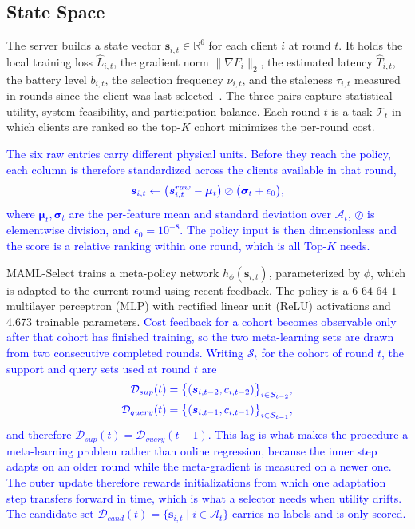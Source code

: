 \documentclass[journal]{IEEEtran}
\theoremstyle{remark}
\newcommand{\revision}[1]{#1}
\newcommand{\revtwo}[1]{\textcolor{blue}{#1}}
\newcommand{\revtwoeq}{\color{blue}}
\begin{document}
\subsection{State Space}
\revision{The server builds a state vector $\bm{s}_{i,t} \in \mathbb{R}^6$ for each client $i$ at round $t$. It holds the local training loss $\hat{L}_{i,t}$, the gradient norm $\|\nabla F_i\|_2$, the estimated latency $\hat{T}_{i,t}$, the battery level $b_{i,t}$, the selection frequency $\nu_{i,t}$, and the staleness $\tau_{i,t}$ measured in rounds since the client was last selected}~\cite{pan2024contextual,xu2024federated}. The three pairs capture statistical utility, system feasibility, and participation balance. Each round $t$ is a task $\mathcal{T}_t$ in which clients are ranked so the top-$K$ cohort minimizes the per-round cost.

\revtwo{The six raw entries carry different physical units. Before they reach the policy, each column is therefore standardized across the clients available in that round,}
\begin{equation}
	\revtwoeq
	\bm{s}_{i,t} \leftarrow \bigl(\bm{s}^{raw}_{i,t}-\bm{\mu}_t\bigr)\oslash\bigl(\bm{\sigma}_t+\epsilon_0\bigr),
	\label{eq:zscore}
\end{equation}
\revtwo{where $\bm{\mu}_t,\bm{\sigma}_t$ are the per-feature mean and standard deviation over $\mathcal{A}_t$, $\oslash$ is elementwise division, and $\epsilon_0=10^{-8}$. The policy input is then dimensionless and the score is a relative ranking within one round, which is all Top-$K$ needs.}

MAML-Select trains a meta-policy network $h_\phi(\bm{s}_{i,t})$, parameterized by $\phi$, which is adapted to the current round using recent feedback. \revision{The policy is a $6$-$64$-$64$-$1$ multilayer perceptron (MLP) with rectified linear unit (ReLU) activations and 4,673 trainable parameters.} \revtwo{Cost feedback for a cohort becomes observable only after that cohort has finished training, so the two meta-learning sets are drawn from two consecutive completed rounds. Writing $\mathcal{S}_t$ for the cohort of round $t$, the support and query sets used at round $t$ are}
\begin{equation}
	\revtwoeq
	\begin{aligned}
	\mathcal{D}_{sup}(t) &= \bigl\{(\bm{s}_{i,t-2},c_{i,t-2})\bigr\}_{i\in\mathcal{S}_{t-2}}, \\
	\mathcal{D}_{query}(t) &= \bigl\{(\bm{s}_{i,t-1},c_{i,t-1})\bigr\}_{i\in\mathcal{S}_{t-1}} ,
	\end{aligned}
	\label{eq:sets}
\end{equation}
\revtwo{and therefore $\mathcal{D}_{sup}(t)=\mathcal{D}_{query}(t-1)$. This lag is what makes the procedure a meta-learning problem rather than online regression, because the inner step adapts on an older round while the meta-gradient is measured on a newer one. The outer update therefore rewards initializations from which one adaptation step transfers forward in time, which is what a selector needs when utility drifts. The candidate set $\mathcal{D}_{cand}(t)=\{\bm{s}_{i,t}\mid i\in\mathcal{A}_t\}$ carries no labels and is only scored.}
\end{document}
